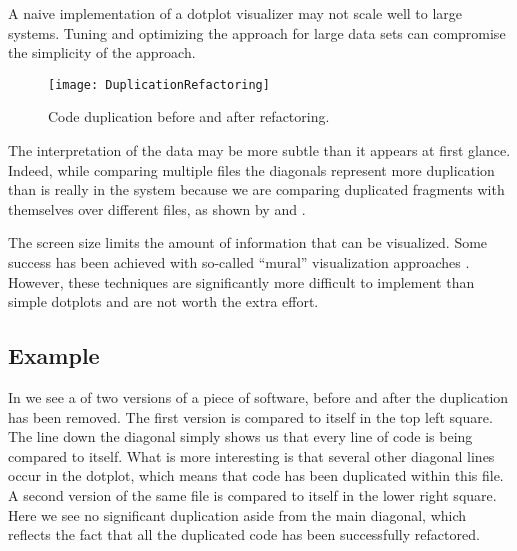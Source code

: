 \documentclass[a4paper,10pt,twoside]{book}
\begin{document}
\begin{bulletlist}
\item A naive implementation of a dotplot visualizer may not scale well to large systems. Tuning and optimizing the approach for large data sets can compromise the simplicity of the approach.

\begin{figure}[t]
\begin{center}
\texttt{[image: DuplicationRefactoring]}
\caption{Code duplication before and after refactoring.}
\end{center}
\end{figure}

\item The interpretation of the data may be more subtle than it appears at first glance. Indeed, while comparing multiple files the diagonals represent more duplication than is really in the system because we are comparing duplicated fragments with themselves over different files, as shown by  and .

\item The screen size limits the amount of information that can be visualized. Some success has been achieved with so-called ``mural'' visualization approaches \cite{Jerd96b}. However, these techniques are significantly more difficult to implement than simple dotplots and are not worth the extra effort.
\end{bulletlist}

\subsection*{Example}

In  we see a  of two versions of a piece of software, before and after the duplication has been removed. The first version is compared to itself in the top left square. The line down the diagonal simply shows us that every line of code is being compared to itself. What is more interesting is that several other diagonal lines occur in the dotplot, which means that code has been duplicated within this file. A second version of the same file is compared to itself in the lower right square. Here we see no significant duplication aside from the main diagonal, which reflects the fact that all the duplicated code has been successfully refactored.
\end{document}
